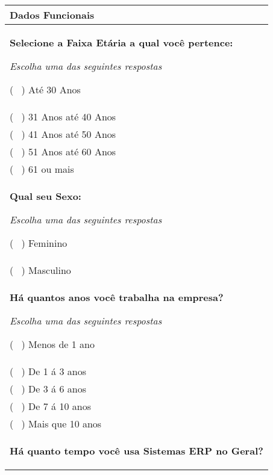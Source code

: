 \bigskip

\noindent  \begin{longtable}{|p{15.7cm}|}
	\hline
	\tabitem \textbf{Dados Funcionais} \\
	\hline
	\begin{Spacing}{0.8} 
		\textbf{Selecione a Faixa Etária a qual você pertence:} \end{Spacing} 
	\begin{Spacing}{2.0} 
		\tiny \textit{Escolha uma das seguintes respostas} \end{Spacing}
	( \ ) Até 30 Anos \\
	( \ ) 31  Anos até 40  Anos \\
	( \ ) 41  Anos até 50  Anos \\
	( \ ) 51  Anos até 60  Anos \\
	( \ ) 61 ou mais \\
	\begin{Spacing}{0.8} \end{Spacing}
	\begin{Spacing}{0.8} 
		\textbf{Qual seu Sexo:} \end{Spacing} 
	\begin{Spacing}{2.0} 
		\tiny \textit{Escolha uma das seguintes respostas} \end{Spacing} 
	( \ ) Feminino \\
	( \ ) Masculino \\
	\begin{Spacing}{0.8} \end{Spacing}
	\begin{Spacing}{0.8} 
		\textbf{Há quantos anos você trabalha na empresa?} \end{Spacing} 
	\begin{Spacing}{2.0} 
		\tiny \textit{Escolha uma das seguintes respostas} \end{Spacing} 
	( \ ) Menos de 1 ano \\
	( \ ) De 1 á 3 anos \\
	( \ ) De 3 á 6 anos \\
	( \ ) De 7 á 10 anos \\
	( \ ) Mais que 10 anos \\
	\begin{Spacing}{0.8} \end{Spacing}
	\begin{Spacing}{0.8} 
		\textbf{Há quanto tempo você usa Sistemas ERP no Geral?} \end{Spacing} 

\end{longtable}

